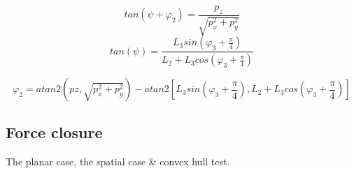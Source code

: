 \[
tan \left( ψ + φ_2 \right) = \frac{p_z}{\sqrt{p_x^2 + p_y^2}}
\]
\[
tan \left( ψ \right) = \frac{L_3 sin \left( φ_3 + \frac{π}{4} \right) }{L_2 + L_3 cos \left( φ_3 + \frac{π}{4} \right)}
\]

\begin{equation}
φ_2 = atan2 \left( pz, \sqrt{p_x^2 + p_y^2} \right) - atan2 \left[ L_3 sin \left( φ_3 + \frac{π}{4} \right), L_2 + L_3 cos \left( φ_3 + \frac{π}{4} \right) \right]
\end{equation}

\subsection{Force closure}
The planar case, the spatial case \& convex hull test.

